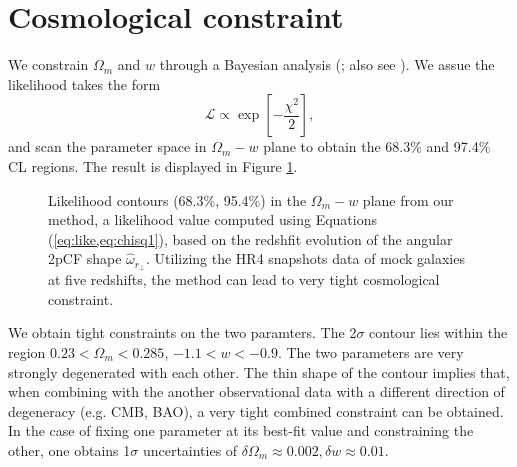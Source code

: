 \documentclass[iop]{emulateapj}
\begin{document}
\section{Cosmological constraint}



We constrain $\Omega_m$ and $w$ through a Bayesian analysis (\cite{Bayesian}; also see \cite{LB2002,Li2016}).
We assue the likelihood takes the form
\begin{equation}\label{eq:like}
 \mathcal{L} \propto \exp\left[-\frac{\chi^2}{2}\right],
\end{equation}
and scan the parameter space in $\Omega_m-w$ plane to obtain the 68.3\% and 97.4\% CL regions.
The result is displayed in Figure \ref{fig_contours}.


\begin{figure}
   \caption{\label{fig_contours}
   Likelihood contours (68.3\%, 95.4\%) in the $\Omega_m-w$ plane from our method,
   a likelihood value computed using Equations (\ref{eq:like,eq:chisq1}), 
   based on the redshfit evolution of the angular 2pCF shape $\hat\omega_{r_\perp}$.
   Utilizing the HR4 snapshots data of mock galaxies at five redshifts,
   the method can lead to very tight cosmological constraint.
   }
\end{figure}

We obtain tight constraints on the two paramters.
The 2$\sigma$ contour lies within the region $0.23<\Omega_m<0.285$, $-1.1<w<-0.9$.
The two parameters are very strongly degenerated with each other.
The thin shape of the contour implies that, 
when combining with the another observational data with a different direction of degeneracy (e.g. CMB, BAO),
a very tight combined constraint can be obtained.
In the case of fixing one parameter at its best-fit value and constraining the other,
one obtains 1$\sigma$ uncertainties of $\delta\Omega_m\approx0.002,\delta w\approx0.01$. 
\end{document}

